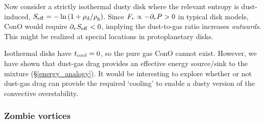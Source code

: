 
Now consider a strictly isothermal dusty disk where the relevant 
entropy is dust-induced, $S_\mathrm{eff} =-\ln{(1+\rho_\mathrm{d}/\rho_\mathrm{g})}$. 
Since $F_r\propto -\partial_rP > 0$ in typical disk models, ConO would
require $\partial_rS_\mathrm{eff}<0$, implying the dust-to-gas ratio increases
\emph{outwards}. This might be realized at special locations in
protoplanetary disks.    


Isothermal disks have $t_\mathrm{cool}=0$, so the pure gas ConO cannot
exist. However, we have shown that dust-gas drag provides an effective
energy source/sink to the mixture (\S\ref{energy_analogy}). It would be
interesting to explore whether or not dust-gas drag can provide the 
required `cooling' to enable a dusty version of the convective 
overstability. 







\subsubsection{Zombie vortices}

